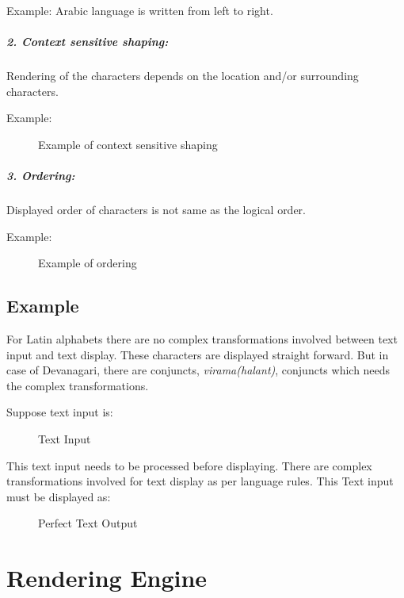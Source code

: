 Example: Arabic language is written from left to right.

\subparagraph{2. Context sensitive shaping:}
Rendering of the characters depends on the location and/or  surrounding characters.

Example:
\begin{figure}[htbp]
\centerline{}
\caption{Example of context sensitive shaping} \label{Gnome Terminal2}
\end{figure}


\subparagraph{3. Ordering:}
Displayed order of characters is not same as the logical order.

Example:
\begin{figure}[htbp]
\centerline{}
\caption{Example of ordering} \label{Gnome Terminal3}
\end{figure}

\subsection{Example}
For Latin alphabets there are no complex transformations involved between text input and text display. These characters are displayed straight forward. But in case of Devanagari, there are conjuncts, \textit{virama(halant)}, conjuncts which needs the complex transformations.

Suppose text input is:

\begin{figure}[htbp]
\centerline{}
\caption{Text Input} \label{Gnome Terminal4}
\end{figure}

This text input needs to be processed before displaying. There are complex transformations involved for text display as per language rules. This Text input must be displayed as:

\begin{figure}[htbp]
\centerline{}
\caption{Perfect Text Output} \label{Gnome Terminal5}
\end{figure}

\section{Rendering Engine}


